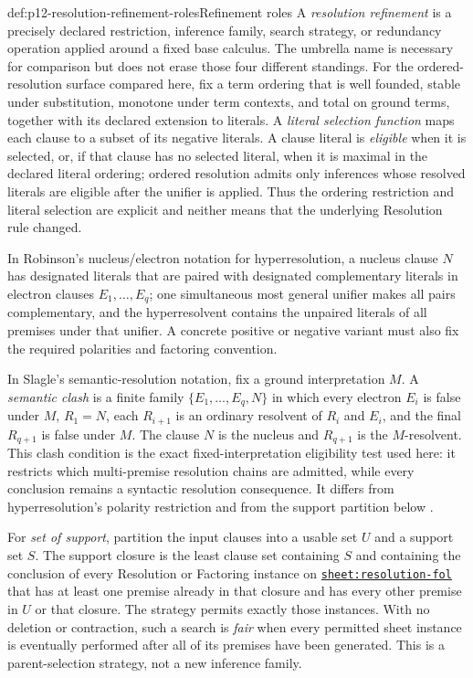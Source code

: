 \begin{hbdefinition}{def:p12-resolution-refinement-roles}{Refinement roles}
A \emph{resolution refinement} is a precisely declared restriction, inference
family, search strategy, or redundancy operation applied around a fixed base
calculus.  The umbrella name is necessary for comparison but does not erase
those four different standings.  For the ordered-resolution surface compared
here, fix a term ordering that is well founded, stable under substitution,
monotone under term contexts, and total on ground terms, together with its
declared extension to literals.  A \emph{literal selection function} maps each
clause to a subset of its negative literals.  A clause literal is
\emph{eligible} when it is selected, or, if that clause has no selected
literal, when it is maximal in the declared literal ordering; ordered
resolution admits only inferences whose resolved literals are eligible after
the unifier is applied.  Thus the ordering restriction and literal selection
are explicit and neither means that the underlying Resolution rule changed.

In Robinson's nucleus/electron
notation for hyperresolution, a nucleus clause \(N\) has designated literals
that are paired with designated complementary literals in electron clauses
\(E_1,\ldots,E_q\); one simultaneous most general unifier makes all pairs
complementary, and the hyperresolvent contains the unpaired literals of all
premises under that unifier.  A concrete positive or negative variant must
also fix the required polarities and factoring convention.

In Slagle's semantic-resolution notation, fix a ground interpretation \(M\).
A \emph{semantic clash} is a finite family
\(\{E_1,\ldots,E_q,N\}\) in which every electron \(E_i\) is false under
\(M\), \(R_1=N\), each \(R_{i+1}\) is an ordinary resolvent of \(R_i\) and
\(E_i\), and the final \(R_{q+1}\) is false under \(M\).  The clause \(N\)
is the nucleus and \(R_{q+1}\) is the \(M\)-resolvent.  This clash condition
is the exact fixed-interpretation eligibility test used here: it restricts
which multi-premise resolution chains are admitted, while every conclusion
remains a syntactic resolution consequence.  It differs from hyperresolution's
polarity restriction and from the support partition below
\cite{Robinson1965,Slagle1967}.

For \emph{set of support}, partition the input clauses into a usable set
\(U\) and a support set \(S\).  The support closure is the least clause set
containing \(S\) and containing the conclusion of every Resolution or
Factoring instance on
\hyperref[sheet:resolution-fol]{\texttt{sheet:resolution-fol}} that has at
least one premise already in that closure and has every other premise in
\(U\) or that closure.  The strategy permits exactly those instances.  With
no deletion or contraction, such a search is \emph{fair} when every permitted
sheet instance is eventually performed after all of its premises have been
generated.  This is a parent-selection strategy, not a new
inference family.


\end{hbdefinition}
